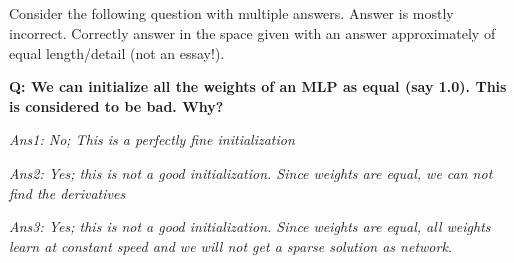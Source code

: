 \begin{frame}
\section{}
Consider the following question with multiple answers. Answer is mostly incorrect. Correctly answer in the space given with an answer approximately of equal length/detail (not an essay!).

{\bf Q: We can initialize all the weights of an MLP as equal (say 1.0). This is considered to be bad. Why?}

{\em Ans1: No; This is a perfectly fine initialization}

{\em Ans2: Yes; this is not a good initialization. Since weights are equal, we can not find the derivatives}

{\em Ans3: Yes; this is not a good initialization. Since weights are equal, all weights learn at constant speed and we will not get a sparse solution as network.}

\end{frame}
